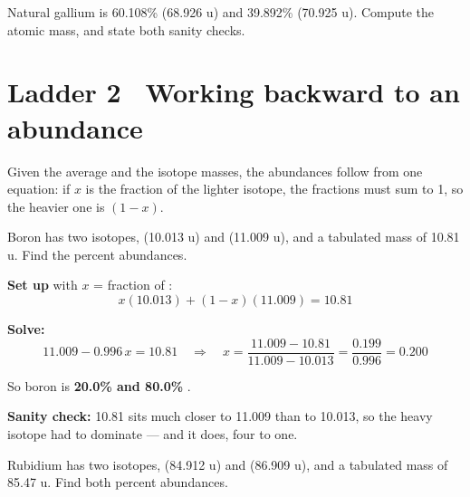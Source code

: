 \documentclass{apchem-worksheet}
\begin{document}
\begin{yourturn}
Natural gallium is 60.108\%  (68.926 u) and 39.892\%
 (70.925 u). Compute the atomic mass, and state both sanity
checks. \workspace[3cm]
\end{yourturn}

\section*{\sffamily Ladder 2 \textbullet\ Working backward to an
abundance}

Given the average and the isotope masses, the abundances follow from one
equation: if $x$ is the fraction of the lighter isotope, the fractions
must sum to 1, so the heavier one is $(1-x)$.

\begin{workedexample}
Boron has two isotopes,  (10.013 u) and 
(11.009 u), and a tabulated mass of 10.81 u. Find the percent abundances.

\textbf{Set up} with $x$ = fraction of :
\[ x(10.013) + (1 - x)(11.009) = 10.81 \]

\textbf{Solve:}
\[ 11.009 - 0.996\,x = 10.81 \quad\Longrightarrow\quad
   x = \frac{11.009 - 10.81}{11.009 - 10.013} = \frac{0.199}{0.996}
   = 0.200 \]

So boron is \textbf{20.0\%  and 80.0\% }.

\textbf{Sanity check:} 10.81 sits much closer to 11.009 than to 10.013,
so the heavy isotope had to dominate --- and it does, four to one.
\end{workedexample}

\begin{yourturn}
Rubidium has two isotopes,  (84.912 u) and 
(86.909 u), and a tabulated mass of 85.47 u. Find both percent
abundances. \workspace[3.4cm]
\end{yourturn}
\end{document}
